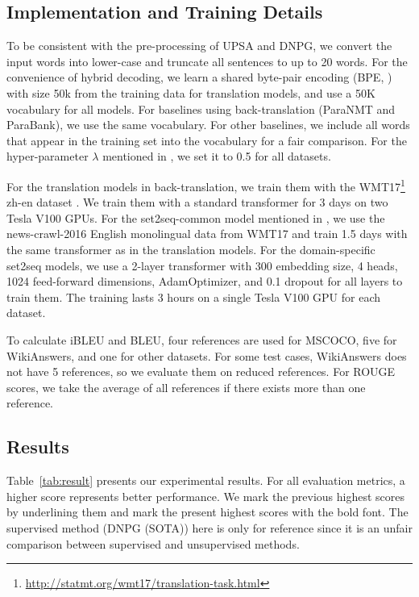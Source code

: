\subsection{Implementation and Training Details} \label{sec:exset}
To be consistent with the pre-processing of UPSA and DNPG, we convert the input words into lower-case and truncate all sentences to up to 20 words. 
For the convenience of hybrid decoding, 
we learn a shared byte-pair encoding (BPE, \citet{sennrich2016edinburgh}) 
with size 50k from the training data for translation models, 
and use a 50K vocabulary for all models. For baselines using back-translation (ParaNMT and ParaBank), we use the same vocabulary. For other baselines, we include all words that appear in the training set into the vocabulary for a fair comparison. For the hyper-parameter $\lambda$ mentioned in 
, we set it to 0.5 for all datasets.

For the translation models in back-translation, we train them with the WMT17\footnote{\url{http://statmt.org/wmt17/translation-task.html}} zh-en dataset \citep{ziemski2016united}. We train them with a standard transformer for 3 days on two Tesla V100 GPUs. For the set2seq-common model mentioned in , we use the news-crawl-2016 English monolingual data from WMT17 and train 1.5 days with the same transformer as in the translation models. For the domain-specific set2seq models, we use a 2-layer transformer with 300 embedding size, 4 heads, 1024 feed-forward dimensions, AdamOptimizer, and 0.1 dropout for all layers to train them. The training lasts 3 hours on a single Tesla V100 GPU for each dataset.

To calculate iBLEU and BLEU, four references are used for MSCOCO, five for WikiAnswers, and one for other datasets. For some test cases, WikiAnswers does not have 5 references, so we evaluate them on reduced references. 
For ROUGE scores, we take the average of all references if there exists 
more than one reference.

\subsection{Results} \label{sec:result}

Table~\ref{tab:result} presents our experimental results. For all evaluation metrics, a higher score represents better performance. We mark the previous highest scores by underlining them and mark the present highest scores with the bold font.
The supervised method (DNPG (SOTA)) here is only for reference since it is an unfair comparison between supervised and unsupervised methods.

